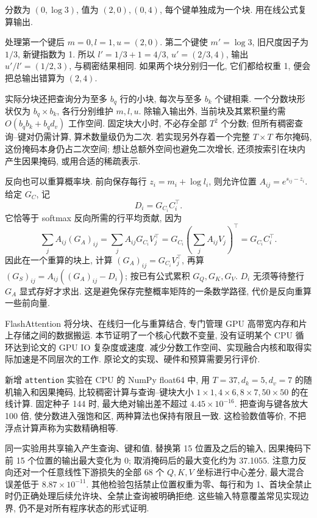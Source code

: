 \begin{example}
分数为 $(0,\log3)$, 值为 $(2,0),(0,4)$, 每个键单独成为一个块. 用在线公式复算输出.
\end{example}
\begin{solution}
处理第一个键后 $m=0,l=1,u=(2,0)$. 第二个键使 $m'=\log3$, 旧尺度因子为 $1/3$, 新键指数为 1. 所以 $l'=1/3+1=4/3$, $u'=(2/3,4)$, 输出 $u'/l'=(1/2,3)$, 与稠密结果相同. 如果两个块分别归一化, 它们都给权重 1, 便会把总输出错算为 $(2,4)$.
\end{solution}

实际分块还把查询分为至多 $b_q$ 行的小块, 每次与至多 $b_k$ 个键相乘. 一个分数块形状仅为 $b_q\times b_k$, 各行分别维护 $m,l,u$. 除输入输出外, 当前块及其累积量约需 $O(b_qb_k+b_qd_v)$ 工作空间. 固定块大小时, 不必存全部 $T^2$ 个分数; 但所有稠密查询--键对仍需计算, 算术数量级仍为二次. 若实现另外存着一个完整 $T\times T$ 布尔掩码, 这份掩码本身仍占二次空间; 想让总额外空间也避免二次增长, 还须按索引在块内产生因果掩码, 或用合适的稀疏表示.

反向也可以重算概率块. 前向保存每行 $z_i=m_i+\log l_i$, 则允许位置 $A_{ij}=e^{s_{ij}-z_i}$. 给定 $G_C$, 记
\[
D_i=G_{C_i}C_i^\top.
\]
它恰等于 softmax 反向所需的行平均贡献, 因为
\[
\sum_j A_{ij}(G_A)_{ij}
=\sum_jA_{ij}G_{C_i}V_j^\top
=G_{C_i}\left(\sum_j A_{ij}V_j\right)^\top
=G_{C_i}C_i^\top.
\]
因此在一个重算的块上, 计算 $(G_A)_{ij}=G_{C_i}V_j^\top$, 再算 $(G_S)_{ij}=A_{ij}((G_A)_{ij}-D_i)$; 按已有公式累积 $G_Q,G_K,G_V$. $D_i$ 无须等待整行 $G_A$ 显式存好才求出. 这是避免保存完整概率矩阵的一条数学路径, 代价是反向重算一些前向量.

FlashAttention 将分块、在线归一化与重算结合, 专门管理 GPU 高带宽内存和片上存储之间的数据搬运\cite{flash}. 本节证明了一个核心代数不变量, 没有证明某个 CPU 循环达到论文的 GPU IO 复杂度或速度. 减少分数工作空间、实现融合内核和取得实际加速是不同层次的工作. 原论文的实现、硬件和预算需要另行评价.


新增 \texttt{attention} 实验在 CPU 的 NumPy float64 中, 用 $T=37,d_k=5,d_v=7$ 的随机输入和因果掩码, 比较稠密计算与查询--键块大小 $1\times1,4\times6,8\times7,50\times50$ 的在线计算. 固定种子 144 时, 最大绝对输出差不超过 $4.45\times10^{-16}$. 把查询与键各放大 100 倍, 使分数进入强饱和区, 两种算法也保持有限且一致. 这检验数值等价, 不把浮点计算声称为实数精确相等.

同一实验用共享输入产生查询、键和值, 替换第 15 位置及之后的输入, 因果掩码下前 15 个位置的输出最大变化为 0; 取消掩码后的最大变化约为 37.1055. 注意力反向还对一个任意线性下游损失的全部 68 个 $Q,K,V$ 坐标进行中心差分, 最大混合误差低于 $8.87\times10^{-11}$. 其他检验包括禁止位置权重为零、每行和为 1、首块全禁止时仍正确处理后续允许块、全禁止查询被明确拒绝. 这些输入特意覆盖常见实现边界, 仍不是对所有程序状态的形式证明.

